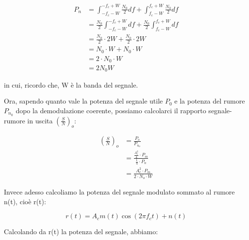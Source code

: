 {
    \Large 
    \begin{equation}
        \begin{split}
            P_n
            &= 
            \int_{-f_c - W}^{- f_c + W} \frac{N_0}{2} df 
            +
            \int_{f_c - W}^{ f_c + W} \frac{N_0}{2} df
            \\
            &=
            \frac{N_0}{2} \int_{-f_c - W}^{- f_c + W} df 
            + 
            \frac{N_0}{2} \int_{f_c - W}^{f_c + W} df
            \\
            &= 
            \frac{N_0}{2} \cdot 2W
            +
            \frac{N_0}{2} \cdot 2W
            \\
            &= 
            N_0 \cdot W + N_0 \cdot W 
            \\
            &= 
            2 \cdot N_0 \cdot W
            \\
            &= 
            2  N_0  W
        \end{split}
    \end{equation}
}

in cui, ricordo che, W è la banda del segnale. \newline 

Ora, sapendo quanto vale la potenza del segnale utile $P_0$ e la potenza del rumore $P_{n_0}$ dopo la demodulazione coerente, 
possiamo calcolarci il rapporto segnale-rumore in uscita $\left(\frac{S}{N} \right)_{o}$: 

{
    \Large 
    \begin{equation}
        \begin{split}
        \left(\frac{S}{N} \right)_{o}
        &= 
        \frac{P_o}{P_{n_o}}
        \\
        &= 
        \frac{\frac{A_c ^{2}}{4} \cdot P_m}{\frac{1}{4} \cdot P_n}
        \\
        &= 
        \frac{A_c ^{2} \cdot P_m}{2 \cdot N_o \cdot W}
    \end{split}
    \end{equation}

}

Invece adesso calcoliamo la potenza del segnale modulato sommato al rumore n(t), cioè r(t):

{
    \Large 
    \begin{equation}
        r(t) 
        = 
        A_c m(t) \cos(2 \pi f_c t) + n(t)
    \end{equation}
}

Calcolando da r(t) la potenza del segnale, abbiamo: 

